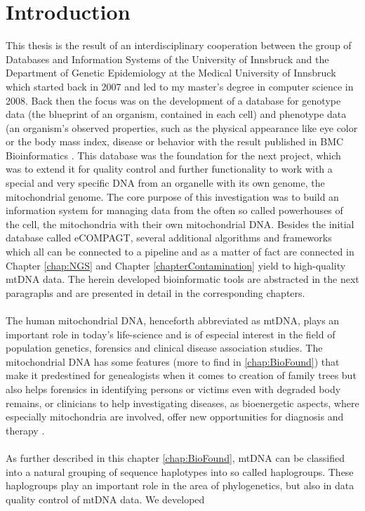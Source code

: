 \chapter{Introduction}
\label{chapterIntro}
This thesis is the result of an interdisciplinary cooperation between the group of Databases and Information Systems of the University of Innsbruck and the Department of Genetic Epidemiology at the Medical University of Innsbruck which started back in 2007 and led to my master's degree in computer science in 2008. Back then the focus was on the development of a database for genotype data (the blueprint of an organism, contained in each cell) and phenotype data (an organism's observed properties, such as the physical appearance like eye color or the body mass index, disease or behavior with the result published in BMC Bioinformatics \cite{Schoenherr2009}. This database was the foundation for the next project, which was to extend it for quality control and further functionality to work with a special and very specific DNA from an organelle with its own genome, the mitochondrial genome. The core purpose of this investigation was to build an information system for managing data from the often so called powerhouses of the cell, the mitochondria with their own mitochondrial DNA. Besides the initial database called eCOMPAGT, several additional algorithms and frameworks which all can be connected to a pipeline and as a matter of fact are connected in Chapter \ref{chap:NGS} and Chapter \ref{chapterContamination} yield to high-quality mtDNA data. The herein developed bioinformatic tools are abstracted in the next paragraphs and are presented in detail in the corresponding chapters.
\\
\\
The human mitochondrial DNA, henceforth abbreviated as mtDNA, plays an important role in today's life-science and is of especial interest in the field of population genetics, forensics and clinical disease association studies. The mitochondrial DNA has some features (more to find in \ref{chap:BioFound}) that make it predestined for genealogists when it comes to creation of family trees but also helps forensics in identifying persons or victims even with degraded body remains, or clinicians to help investigating diseases, as bioenergetic aspects, where especially mitochondria are involved, offer new opportunities for diagnosis and therapy \cite{Picard2016}.
\\
\\
As further described in this chapter \ref{chap:BioFound}, mtDNA can be classified into a natural grouping of sequence haplotypes into so called haplogroups. These haplogroups play an important role in the area of phylogenetics, but also in data quality control of mtDNA data. We developed
